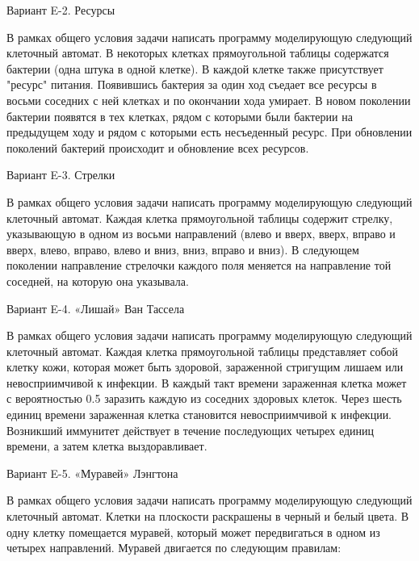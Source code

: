 
Вариант E-2. Ресурсы

В рамках общего условия задачи написать программу моделирующую следующий
клеточный автомат. В некоторых клетках прямоугольной таблицы содержатся
бактерии (одна штука в одной клетке). В каждой клетке также присутствует
"ресурс" питания. Появившись бактерия за один ход съедает все ресурсы в восьми
соседних с ней клетках и по окончании хода умирает. В новом поколении бактерии
появятся в тех клетках, рядом с которыми были бактерии на предыдущем ходу и
рядом с которыми есть несъеденный ресурс. При обновлении поколений бактерий
происходит и обновление всех ресурсов.


Вариант E-3. Стрелки

В рамках общего условия задачи написать программу моделирующую следующий
клеточный автомат. Каждая клетка прямоугольной таблицы содержит стрелку,
указывающую в одном из восьми направлений (влево и вверх, вверх, вправо и
вверх, влево, вправо, влево и вниз, вниз, вправо и вниз). В следующем
поколении направление стрелочки каждого поля меняется на направление той
соседней, на которую она указывала.


Вариант E-4. «Лишай» Ван Тассела

В рамках общего условия задачи написать программу моделирующую следующий
клеточный автомат. Каждая клетка прямоугольной таблицы представляет собой
клетку кожи, которая может быть здоровой, зараженной стригущим лишаем или
невосприимчивой к инфекции. В каждый такт времени зараженная клетка может с
вероятностью 0.5 заразить каждую из соседних здоровых клеток. Через шесть
единиц времени зараженная клетка становится невосприимчивой к инфекции.
Возникший иммунитет действует в течение последующих четырех единиц времени, а
затем клетка выздоравливает.


Вариант E-5. «Муравей» Лэнгтона

В рамках общего условия задачи написать программу моделирующую следующий
клеточный автомат. Клетки на плоскости раскрашены в черный и белый цвета. В
одну клетку помещается муравей, который может передвигаться в одном из четырех
направлений. Муравей двигается по следующим правилам:


